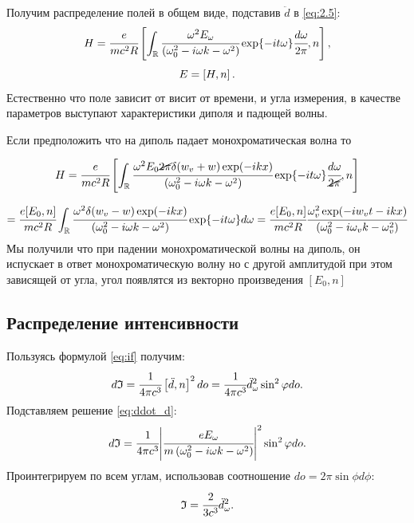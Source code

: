 Получим распределение полей в общем виде, подставив $\ddot d$ в \ref{eq:2.5}:
\begin{equation}
    H = \cfrac{e}{mc^2R}\left[ \int_{\mathbb{R}}
    \cfrac{\omega^2E_\omega}{\left( \omega_0^2 - i\omega k - \omega^2  \right)}\exp{-it\omega}\cfrac{d\omega}{2\pi}, n \right],
    \label{eq:fild}
\end{equation}
\begin{equation}
    E = \left[ H, n \right].
\end{equation}
Естественно что поле зависит от висит от времени, и угла измерения, 
в качестве параметров выступают характеристики диполя и падющей волны. 

Если предположить что на диполь падает монохроматическая волна то 

\begin{equation}
    H = \cfrac{e}{mc^2R}\left[ \int_{\mathbb{R}}
    \cfrac{\omega^2 E_0 \cancel{2 \pi} \delta (w_v+w) \exp (-ikx)}{\left( \omega_0^2 - i\omega k - \omega^2  \right)}\exp{-it\omega}
    \cfrac{d\omega}{\cancel{2 \pi}}, n \right]
\end{equation}

\begin{equation}
    = \cfrac{e[E_0, n]}{mc^2R}\int_{\mathbb{R}}
    \cfrac{\omega^2 \delta (w_v-w) \exp (-ikx)}{\left( \omega_0^2 - i\omega k - \omega^2  \right)}\exp{-it\omega}
    d\omega = 
    \cfrac{e[E_0, n]}{mc^2R}
    \cfrac{\omega_v^2 \exp (-iw_v t-ikx)}{\left( \omega_0^2 - i\omega_v k - \omega_v^2  \right)}
\end{equation}
Мы получили что при падении монохроматической волны на диполь, он испускает 
в ответ монохроматическую волну но с другой амплитудой при этом зависящей от 
угла, угол появлятся из векторно произведения $[E_0, n]$


\subsection{Распределение интенсивности}

Пользуясь формулой \ref{eq:if} получим:
\begin{equation}
    d\mathfrak{I} = \cfrac{1}{4\pi c^3}\left[ \ddot{d}, n \right]^2do
    = \cfrac{1}{4\pi c^3}\ddot d^2_\omega \sin^2\varphi do.
\end{equation}
Подставляем решение \ref{eq:ddot_d}:
\begin{equation}
    d\mathfrak{I} = \cfrac{1}{4\pi c^3} \abs{\cfrac{eE_\omega}{m\left( \omega_0^2 
    - i\omega k - \omega^2  \right)}}^2 \sin^2\varphi do.
\end{equation}
Проинтегрируем по всем углам, использовав соотношение $do = 2 \pi \sin{\phi} d\phi$:
\begin{equation}
    \mathfrak{I} = \cfrac{2}{3c^3} \ddot{d}^2_\omega.
\end{equation}

